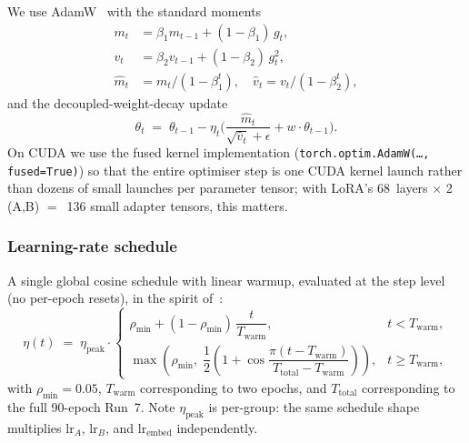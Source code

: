 \documentclass[11pt,a4paper]{article}
\begin{document}
We use AdamW~\cite{adamw} with the standard moments
\begin{align}
    m_t &= \beta_1 m_{t-1} + (1 - \beta_1)\, g_t, \\
    v_t &= \beta_2 v_{t-1} + (1 - \beta_2)\, g_t^2, \\
    \hat m_t &= m_t / (1 - \beta_1^t), \quad
    \hat v_t = v_t / (1 - \beta_2^t),
\end{align}
and the decoupled-weight-decay update
\begin{equation}
    \theta_t \;=\; \theta_{t-1}
        - \eta_t \biggl( \frac{\hat m_t}{\sqrt{\hat v_t} + \epsilon}
                          + w \cdot \theta_{t-1} \biggr).
\end{equation}
On CUDA we use the fused kernel implementation
(\texttt{torch.optim.AdamW(\dots,\,fused=True)}) so that the entire
optimiser step is one CUDA kernel launch rather than dozens of small
launches per parameter tensor; with LoRA's 68~layers $\times$ 2 (A,B)
$=$~136 small adapter tensors, this matters.

\subsubsection{Learning-rate schedule}

A single global cosine schedule with linear warmup, evaluated at the
step level (no per-epoch resets), in the spirit of~\cite{gpt3}:
\begin{equation}
    \eta(t) \;=\; \eta_\text{peak} \cdot
    \begin{cases}
        \rho_\text{min} + (1 - \rho_\text{min})\, \dfrac{t}{T_\text{warm}},
            & t < T_\text{warm}, \\[8pt]
        \max\!\left(\rho_\text{min},\;
            \dfrac{1}{2}\!\left(1 + \cos\!\dfrac{\pi(t - T_\text{warm})}{T_\text{total} - T_\text{warm}}\right)\right),
            & t \ge T_\text{warm},
    \end{cases}
\label{eq:schedule}
\end{equation}
with $\rho_\text{min}=0.05$, $T_\text{warm}$ corresponding to two
epochs, and $T_\text{total}$ corresponding to the full 90-epoch
Run~7.
Note $\eta_\text{peak}$ is per-group: the same schedule shape multiplies
$\mathrm{lr}_A$, $\mathrm{lr}_B$, and $\mathrm{lr}_\text{embed}$
independently.
\end{document}
